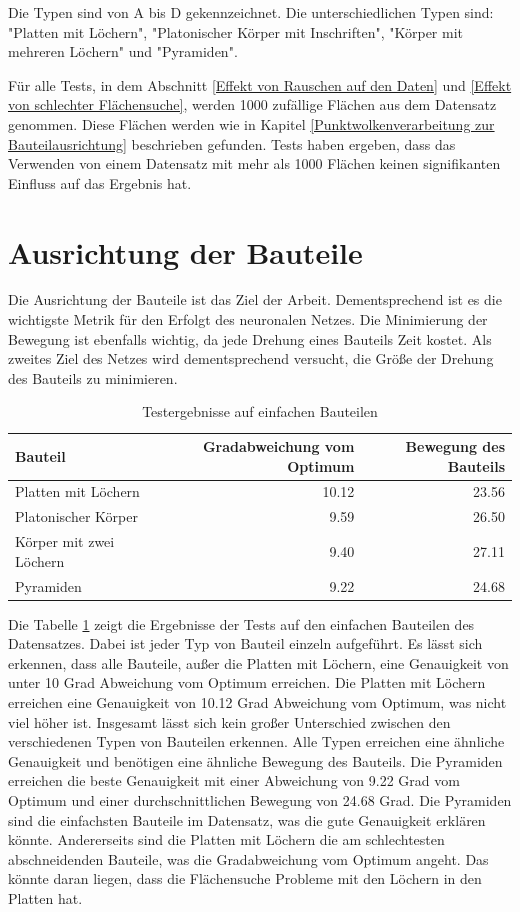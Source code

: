Die Typen sind von A bis D gekennzeichnet. Die unterschiedlichen Typen sind: "Platten mit Löchern", "Platonischer Körper mit Inschriften", "Körper mit mehreren Löchern" und "Pyramiden".

Für alle Tests, in dem Abschnitt \ref{Effekt von Rauschen auf den Daten} und \ref{Effekt von schlechter Flächensuche}, werden 1000 zufällige Flächen aus dem Datensatz genommen. Diese Flächen werden wie in Kapitel \ref{Punktwolkenverarbeitung zur Bauteilausrichtung} beschrieben gefunden. 
Tests haben ergeben, dass das Verwenden von einem Datensatz mit mehr als 1000 Flächen keinen signifikanten Einfluss auf das Ergebnis hat. 

\section{Ausrichtung der Bauteile}
\label{Ausrichtung der Bauteile}

Die Ausrichtung der Bauteile ist das Ziel der Arbeit. Dementsprechend ist es die wichtigste Metrik für den Erfolgt des neuronalen Netzes.
Die Minimierung der Bewegung ist ebenfalls wichtig, da jede Drehung eines Bauteils Zeit kostet. Als zweites Ziel des Netzes wird dementsprechend versucht, die Größe der Drehung des Bauteils zu minimieren.

\begin{table}[h]
\centering
\begin{tabular}{lrr}
\toprule
Bauteil & Gradabweichung vom Optimum & Bewegung des Bauteils\\ 
\midrule
Platten mit Löchern & 10.12 & 23.56 \\ \addlinespace
Platonischer Körper & 9.59 & 26.50 \\ \addlinespace
Körper mit zwei Löchern & 9.40 & 27.11\\
Pyramiden & 9.22 & 24.68\\
\bottomrule
\end{tabular}
\caption{Testergebnisse auf einfachen Bauteilen}
\label{table:Testergebnisse auf einfachen Bauteilen}
\end{table}

Die Tabelle \ref{table:Testergebnisse auf einfachen Bauteilen} zeigt die Ergebnisse der Tests auf den einfachen Bauteilen des Datensatzes. Dabei ist jeder Typ von Bauteil einzeln aufgeführt.
Es lässt sich erkennen, dass alle Bauteile, außer die Platten mit Löchern, eine Genauigkeit von unter 10 Grad Abweichung vom Optimum erreichen. Die Platten mit Löchern erreichen eine Genauigkeit von 10.12 Grad Abweichung vom Optimum, was nicht viel höher ist.
Insgesamt lässt sich kein großer Unterschied zwischen den verschiedenen Typen von Bauteilen erkennen. Alle Typen erreichen eine ähnliche Genauigkeit und benötigen eine ähnliche Bewegung des Bauteils.
Die Pyramiden erreichen die beste Genauigkeit mit einer Abweichung von 9.22 Grad vom Optimum und einer durchschnittlichen Bewegung von 24.68 Grad. Die Pyramiden sind die einfachsten Bauteile im Datensatz, was die gute Genauigkeit erklären könnte.
Andererseits sind die Platten mit Löchern die am schlechtesten abschneidenden Bauteile, was die Gradabweichung vom Optimum angeht. Das könnte daran liegen, dass die Flächensuche Probleme mit den Löchern in den Platten hat.

